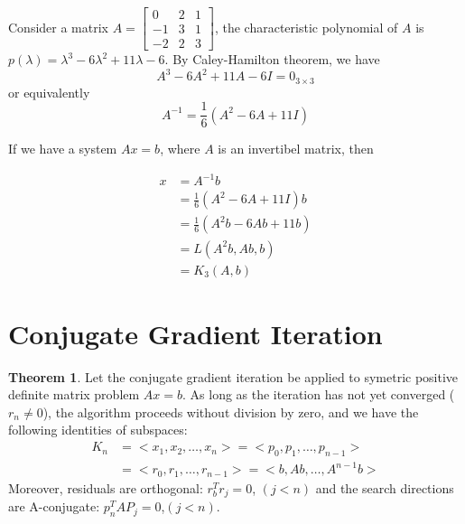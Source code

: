 \documentclass{article}
\theoremstyle{definition}
\newtheorem{theorem}{Theorem}[section]
\begin{document}
Consider a matrix $A=\begin{bmatrix}0 & 2 & 1 \\ -1 & 3 & 1\\ -2 & 2 & 3\end{bmatrix}$, the characteristic polynomial of $A$ is $p(\lambda)=\lambda^3-6\lambda^2+11\lambda-6$. By Caley-Hamilton theorem, we have 
\begin{equation}
A^3-6A^2+11A-6I=0_{3\times3}
\end{equation}
or equivalently
\begin{equation}
A^{-1}=\frac{1}{6}(A^2-6A+11I)
\end{equation}

If we have a system $Ax=b$, where $A$ is an invertibel matrix, then

\begin{align}
x&=A^{-1}b\\
&=\frac{1}{6}(A^2-6A+11I)b\\
&=\frac{1}{6}(A^2b-6Ab+11b)\\
&=L(A^2b,Ab,b)\\
&=K_3(A,b)
\end{align}


\section{Conjugate Gradient Iteration}
\begin{theorem}
Let the conjugate gradient iteration be applied to symetric positive definite matrix problem $Ax=b$. As long as the iteration has not yet converged ($r_n \neq 0$), the algorithm proceeds without division by zero, and we have the following identities of subspaces:
\begin{align}
K_n&=<x_1,x_2,\ldots,x_n>=<p_0,p_1,\ldots,p_{n-1}>\\
&=<r_0,r_1,\ldots,r_{n-1}>=<b,Ab,\ldots,A^{n-1}b>
\end{align}
Moreover, residuals are orthogonal: $r_b^Tr_j=0$, $(j<n)$
and the search directions are A-conjugate: $p_n^TAP_j=0$,$(j<n)$.
\end{theorem}
\end{document}
